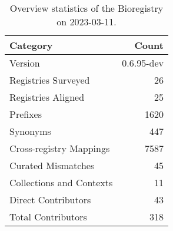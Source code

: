 \begin{table}
\centering
\caption{Overview statistics of the Bioregistry on 2023-03-11.}
\label{tab:bioregistry-summary}
\begin{tabular}{lr}
\toprule
                Category &      Count \\
\midrule
                 Version & 0.6.95-dev \\
     Registries Surveyed &         26 \\
      Registries Aligned &         25 \\
                Prefixes &       1620 \\
                Synonyms &        447 \\
 Cross-registry Mappings &       7587 \\
      Curated Mismatches &         45 \\
Collections and Contexts &         11 \\
     Direct Contributors &         43 \\
      Total Contributors &        318 \\
\bottomrule
\end{tabular}
\end{table}

